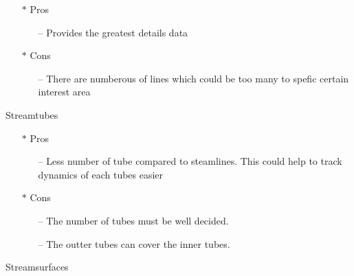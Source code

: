 \documentclass[11pt]{article}
\begin{document}
\begin{itemize}

\item [$\ast$] Pros

\begin{itemize}

\item [--] Provides the greatest details data

\end{itemize}

\item [$\ast$] Cons

\begin{itemize}

\item [--] There are numberous of lines which could be too many to spefic certain interest area

\end{itemize}

\end{itemize}

Streamtubes

\begin{itemize}

\item [$\ast$] Pros

\begin{itemize}

\item [--] Less number of tube compared to steamlines. This could help to track dynamics of each tubes easier

\end{itemize}

\item [$\ast$] Cons

\begin{itemize}

\item [--] The number of tubes must be well decided.
\item [--] The outter tubes can cover the inner tubes.

\end{itemize}

\end{itemize}

Streamsurfaces
\end{document}
